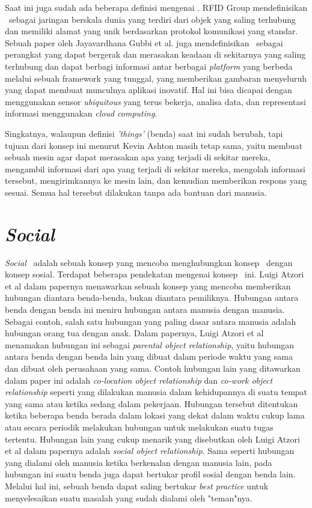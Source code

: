 Saat ini juga sudah ada beberapa definisi mengenai \iot. RFID Group mendefinisikan \iot~sebagai jaringan berskala dunia yang terdiri dari objek yang saling terhubung dan memiliki alamat yang unik berdasarkan protokol komunikasi yang standar\cite{GubbiIot}. Sebuah paper oleh Jayavardhana Gubbi et al.\cite{GubbiIot} juga mendefinisikan \iot~sebagai perangkat yang dapat bergerak dan merasakan keadaan di sekitarnya yang saling terhubung dan dapat berbagi informasi antar berbagai \textit{platform} yang berbeda melalui sebuah framework yang tunggal, yang memberikan gambaran menyeluruh yang dapat membuat munculnya aplikasi inovatif. Hal ini bisa dicapai dengan menggunakan sensor \textit{ubiquitous} yang terus bekerja, analisa data, dan representasi informasi menggunakan \textit{cloud computing}.

Singkatnya, walaupun definisi \textit{'things'} (benda) saat ini sudah berubah, tapi tujuan dari konsep ini menurut Kevin Ashton masih tetap sama, yaitu membuat sebuah mesin agar dapat merasakan apa yang terjadi di sekitar mereka, mengambil informasi dari apa yang terjadi di sekitar mereka, mengolah informasi tersebut, mengirimkannya ke mesin lain, dan kemudian memberikan respons yang sesuai. Semua hal tersebut dilakukan tanpa ada bantuan dari manusia.

\section{\textit{Social} \iot}
\textit{Social} \iot~adalah sebuah konsep yang mencoba menghubungkan konsep \iot~dengan konsep sosial. Terdapat beberapa pendekatan mengenai konsep \siot~ini. Luigi Atzori et al dalam papernya \cite{LuigiSIoT} menawarkan sebuah konsep yang mencoba memberikan hubungan diantara benda-benda, bukan diantara pemiliknya. Hubungan antara benda dengan benda ini meniru hubungan antara manusia dengan manusia. Sebagai contoh, salah satu hubungan yang paling dasar antara manusia adalah hubungan orang tua dengan anak. Dalam papernya, Luigi Atzori et al menamakan hubungan ini sebagai \textit{parental object relationship}, yaitu hubungan antara benda dengan benda lain yang dibuat dalam periode waktu yang sama dan dibuat oleh perusahaan yang sama. Contoh hubungan lain yang ditawarkan dalam paper ini adalah \textit{co-location object relationship} dan \textit{co-work object relationship} seperti yang dilakukan manusia dalam kehidupannya di suatu tempat yang sama atau ketika sedang dalam pekerjaan. Hubungan tersebut ditentukan ketika beberapa benda berada dalam lokasi yang dekat dalam waktu cukup lama atau secara periodik melakukan hubungan untuk melakukan suatu tugas tertentu. Hubungan lain yang cukup menarik yang disebutkan oleh Luigi Atzori et al dalam papernya adalah \textit{social object relationship}. Sama seperti hubungan yang dialami oleh manusia ketika berkenalan dengan manusia lain, pada hubungan ini suatu benda juga dapat bertukar profil sosial dengan benda lain. Melalui hal ini, sebuah benda dapat saling bertukar \textit{best practice} untuk menyelesaikan suatu masalah yang sudah dialami oleh "teman"nya.

